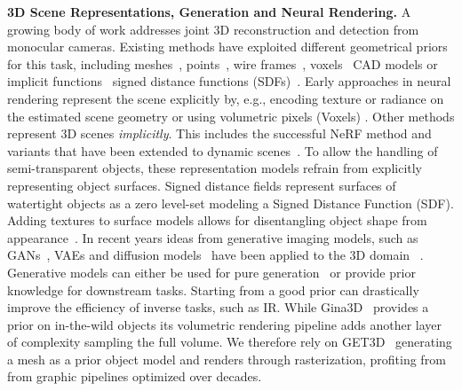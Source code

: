 \vspace{0.5\baselineskip}
\noindent
\textbf{3D Scene Representations, Generation and Neural Rendering.}
%
A growing body of work addresses joint 3D reconstruction and detection from monocular cameras. Existing methods have exploited different geometrical priors~\cite{mao2022review3dod} for this task, including meshes~\cite{beker2020monocular}, points~\cite{ku2019monocular}, wire frames~\cite{he2019mono3d++}, voxels~\cite{xiang2015voxel3dod} CAD models or implicit functions~\cite{ost2021neural} signed distance functions (SDFs)~\cite{zakharov2020autolabeling}. 
Early approaches in neural rendering represent the scene explicitly by, e.g., encoding texture or radiance on the estimated scene geometry \cite{thies2019deferred} or using volumetric pixels (Voxels) \cite{sitzmann2019deepvoxels}. Other methods represent 3D scenes \emph{implicitly}. This includes the successful NeRF method \cite{mildenhall2020nerf} and variants that have been extended to dynamic scenes~\cite{yuan2021star,ost2021neural,park2021nerfies}.
To allow the handling of semi-transparent objects, these representation models refrain from explicitly representing object surfaces. Signed distance fields represent surfaces of watertight objects as a zero level-set \cite{park2019deepsdf, kellnhofer2021neural, chou2022gensdf} modeling a Signed Distance Function (SDF). 
Adding textures to surface models allows for disentangling object shape from appearance~\cite{xiang2021neutex, koestler2022intrinsic}. In recent years ideas from generative imaging models, such as GANs~\cite{karras2019styleGAN,karras2020styleGAN2}, VAEs and diffusion models~\cite{ho2020denoising,nichol2021improved} have been applied to the 3D domain ~\cite{gao2022get3d,shen2023gina3d,hao2021gancraft,chou2022gensdf}. Generative models can either be used for pure generation~\cite{shen2023gina3d} or provide prior knowledge for downstream tasks. Starting from a good prior can drastically improve the efficiency of inverse tasks, such as IR. While Gina3D~\cite{shen2023gina3d} provides a prior on in-the-wild objects its volumetric rendering pipeline adds another layer of complexity sampling the full volume. We therefore rely on GET3D~\cite{gao2022get3d} generating a mesh as a prior object model and renders through rasterization, profiting from from graphic pipelines optimized over decades. 

